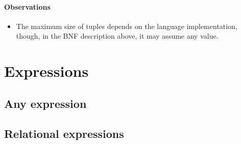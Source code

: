 \documentclass{article}
\begin{document}
    \paragraph{Observations}
    \begin{itemize}
        \item The maximum size of tuples depends on the language implementation, though, in the BNF description
            above, it may assume any value.
    \end{itemize}

\section{Expressions}

    \subsection{Any expression}
        \begin{bnf*}
        \end{bnf*}

    \subsection{Relational expressions}
        \begin{bnf*}
            \\
            \\
            \\
            \\
        \end{bnf*}
\end{document}
